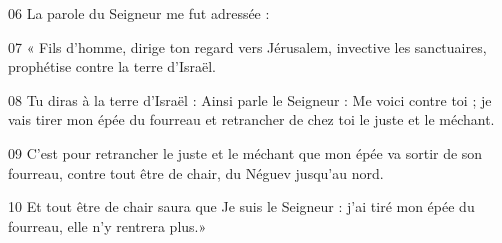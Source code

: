 
06 La parole du Seigneur me fut adressée :

07 « Fils d’homme, dirige ton regard vers Jérusalem, invective les sanctuaires, prophétise contre la terre d’Israël.

08 Tu diras à la terre d’Israël : Ainsi parle le Seigneur : Me voici contre toi ; je vais tirer mon épée du fourreau et retrancher de chez toi le juste et le méchant.

09 C’est pour retrancher le juste et le méchant que mon épée va sortir de son fourreau, contre tout être de chair, du Néguev jusqu’au nord.

10 Et tout être de chair saura que Je suis le Seigneur : j’ai tiré mon épée du fourreau, elle n’y rentrera plus.»
